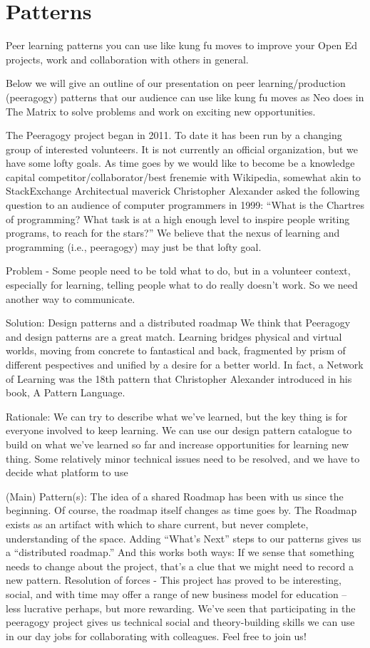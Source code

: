 \section{Patterns}
Peer learning patterns you can use like kung fu moves to improve your Open Ed projects, work and collaboration with others in general.

Below we will give an outline of our presentation on peer learning/production (peeragogy) patterns that our audience can use like kung fu moves as Neo does in The Matrix to solve problems and work on exciting new opportunities.

The Peeragogy project began in 2011.  To date it has been run by a changing group of interested volunteers.   It is not currently an official organization, but we have some lofty goals.  As time goes by we would like to become be a knowledge capital competitor/collaborator/best frenemie with Wikipedia, somewhat akin to StackExchange
Architectual maverick Christopher Alexander asked the following question to an audience of computer programmers in 1999: “What is the Chartres of programming? What task is at a high enough level to inspire people writing programs, to reach for the stars?” 
We believe that the nexus of learning and programming (i.e., peeragogy) may just be that lofty goal.

Problem - Some people need to be told what to do, but in a volunteer context, especially for learning, telling people what to do really doesn't work.  So we need another way to communicate.

Solution: Design patterns and a distributed roadmap
We think that Peeragogy and design patterns are a great match.  Learning bridges physical and virtual worlds, moving from concrete to fantastical and back, fragmented by prism of different pespectives and unified by a desire for a better world. In fact, a Network of Learning was the 18th pattern that Christopher Alexander introduced in his book, A Pattern Language.

Rationale:
We can try to describe what we've learned, but the key thing is for everyone involved to keep learning. We can use our design pattern catalogue to build on what we've learned so far and increase opportunities for learning new thing.
Some relatively minor technical issues need to be resolved, and we
have to decide what platform to use

(Main) Pattern(s):
The idea of a shared Roadmap has been with us since the beginning.  Of course, the roadmap itself changes as time goes by.  The Roadmap  exists as an artifact with which to share current, but never complete,  understanding of the space. Adding “What’s Next” steps to our patterns gives us a “distributed  roadmap.” And this works both ways: If we sense that something needs to  change about the project, that’s a clue that we might need to record a  new pattern.
Resolution of forces -  
This project has proved to be interesting, social, and with time may offer a range of new business model for education -- less lucrative perhaps, but more rewarding.  We've seen that participating in the peeragogy project gives us technical social and theory-building skills we can use in our day jobs for collaborating with colleagues.   Feel free to join us!

